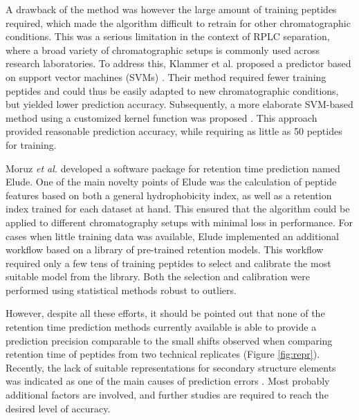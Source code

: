 \documentclass[a4paper]{article}
\begin{document}
A drawback of the method was however the large amount of training
peptides required, which made the algorithm difficult to retrain for
other chromatographic conditions. This was a serious limitation in the
context of RPLC separation, where a broad variety of chromatographic
setups is commonly used across research laboratories. To address this,
Klammer et al. proposed a predictor based on support vector machines
(SVMs) \cite{klammer2007improving}. Their method required fewer
training peptides and could thus be easily adapted to new
chromatographic conditions, but yielded lower prediction
accuracy. Subsequently, a more elaborate SVM-based method using a
customized kernel function was proposed \cite{rtpredict, rtpredictImproved}. This
approach provided reasonable prediction accuracy, while requiring as
little as 50 peptides for training.




Moruz {\em et al.} \cite{elude1} developed a software package for
retention time prediction named {\sc Elude}. One of the main novelty
points of {\sc Elude} was the calculation of peptide features based on
both a general hydrophobicity index, as well as a retention index
trained for each dataset at hand. This ensured that the algorithm
could be applied to different chromatography setups with minimal loss
in performance. For cases when little training data was available,
{\sc Elude} implemented an additional workflow based on a library of
pre-trained retention models. This workflow required only a few tens
of training peptides to select and calibrate the most suitable model
from the library. Both the selection and calibration were performed
using statistical methods robust to outliers.



However, despite all these efforts, it should be pointed out that none
of the retention time prediction methods currently available is able
to provide a prediction precision comparable to the small shifts
observed when comparing retention time of peptides from two technical
replicates (Figure \ref{fig:repr}). Recently, the lack of suitable
representations for secondary structure elements was indicated as one
of the main causes of prediction errors \cite{Reimer2012}.  Most
probably additional factors are involved, and further studies are
required to reach the desired level of accuracy.
\end{document}
